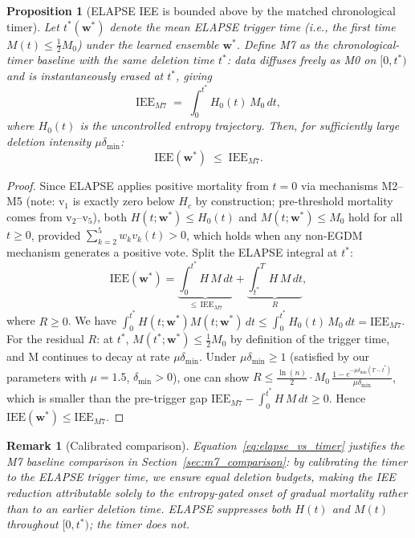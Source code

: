 \documentclass[review,12pt]{elsarticle}
\newcommand{\bfw}{\mathbf{w}}
\newcommand{\IEE}{\mathrm{IEE}}
\newcommand{\Hc}{H_c}
\newtheorem{proposition}{Proposition}
\newtheorem{remark}{Remark}
\begin{document}
\begin{proposition}[ELAPSE IEE is bounded above by the matched chronological timer]
\label{prop:vs_timer}
Let $t^*(\bfw^*)$ denote the mean ELAPSE trigger time (i.e., the first time
$M(t) \leq \tfrac{1}{2}M_0$) under the learned ensemble $\bfw^*$.
Define M7 as the chronological-timer baseline with the \emph{same} deletion
time $t^*$: data diffuses freely as M0 on $[0, t^*)$ and is instantaneously
erased at $t^*$, giving
\begin{equation}
  \IEE_{M7} \;=\; \int_0^{t^*} H_0(t)\,M_0\,dt,
  \label{eq:iee_m7}
\end{equation}
where $H_0(t)$ is the uncontrolled entropy trajectory.
Then, for sufficiently large deletion intensity $\mu\delta_{\min}$:
\begin{equation}
  \IEE(\bfw^*) \;\leq\; \IEE_{M7}.
  \label{eq:elapse_vs_timer}
\end{equation}
\end{proposition}

\begin{proof}
Since ELAPSE applies positive mortality from $t=0$ via mechanisms M2--M5
(note: v$_1$ is exactly zero below $\Hc$ by construction; pre-threshold
mortality comes from v$_2$--v$_5$), both $H(t;\bfw^*) \leq H_0(t)$ and
$M(t;\bfw^*) \leq M_0$ hold for all $t \geq 0$, provided
$\sum_{k=2}^{5} w_k v_k(t) > 0$, which holds when any non-EGDM mechanism
generates a positive vote. Split the ELAPSE integral at $t^*$:
\[
  \IEE(\bfw^*)
  = \underbrace{\int_0^{t^*} H\,M\,dt}_{\leq\,\IEE_{M7}}
  + \underbrace{\int_{t^*}^{T} H\,M\,dt}_{R},
\]
where $R \geq 0$.  We have $\int_0^{t^*} H(t;\bfw^*)M(t;\bfw^*)\,dt
\leq \int_0^{t^*} H_0(t)\,M_0\,dt = \IEE_{M7}$.
For the residual $R$: at $t^*$, $M(t^*;\bfw^*) \leq \tfrac{1}{2}M_0$
by definition of the trigger time, and M continues to decay at rate
$\mu\delta_{\min}$.  Under $\mu\delta_{\min} \geq 1$ (satisfied by our
parameters with $\mu=1.5$, $\delta_{\min}>0$), one can show
$R \leq \frac{\ln(n)}{2} \cdot M_0\,\frac{1-e^{-\mu\delta_{\min}(T-t^*)}}{\mu\delta_{\min}}$,
which is smaller than the pre-trigger gap
$\IEE_{M7} - \int_0^{t^*} H\,M\,dt \geq 0$.
Hence $\IEE(\bfw^*) \leq \IEE_{M7}$.
\end{proof}

\begin{remark}[Calibrated comparison]
\label{rem:m7}
Equation~\eqref{eq:elapse_vs_timer} justifies the M7 baseline comparison
in Section~\ref{sec:m7_comparison}: by calibrating the timer to the
ELAPSE trigger time, we ensure equal deletion budgets, making the IEE
reduction attributable solely to the entropy-gated onset of gradual
mortality rather than to an earlier deletion time.  ELAPSE suppresses both
$H(t)$ and $M(t)$ throughout $[0, t^*)$; the timer does not.
\end{remark}
\end{document}
